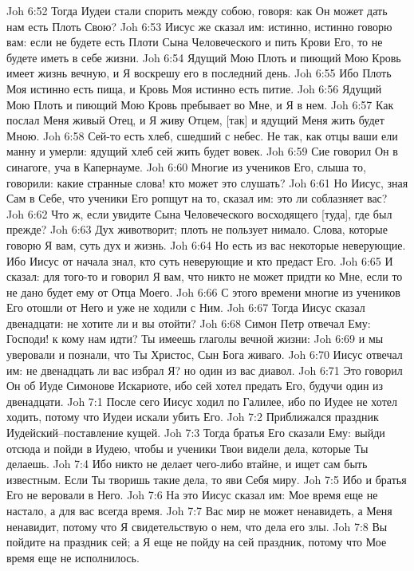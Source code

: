 Joh 6:52  Тогда Иудеи стали спорить между собою, говоря: как Он может дать нам есть Плоть Свою?
Joh 6:53  Иисус же сказал им: истинно, истинно говорю вам: если не будете есть Плоти Сына Человеческого и пить Крови Его, то не будете иметь в себе жизни.
Joh 6:54  Ядущий Мою Плоть и пиющий Мою Кровь имеет жизнь вечную, и Я воскрешу его в последний день.
Joh 6:55  Ибо Плоть Моя истинно есть пища, и Кровь Моя истинно есть питие.
Joh 6:56  Ядущий Мою Плоть и пиющий Мою Кровь пребывает во Мне, и Я в нем.
Joh 6:57  Как послал Меня живый Отец, и Я живу Отцем, [так] и ядущий Меня жить будет Мною.
Joh 6:58  Сей-то есть хлеб, сшедший с небес. Не так, как отцы ваши ели манну и умерли: ядущий хлеб сей жить будет вовек.
Joh 6:59  Сие говорил Он в синагоге, уча в Капернауме.
Joh 6:60  Многие из учеников Его, слыша то, говорили: какие странные слова! кто может это слушать?
Joh 6:61  Но Иисус, зная Сам в Себе, что ученики Его ропщут на то, сказал им: это ли соблазняет вас?
Joh 6:62  Что ж, если увидите Сына Человеческого восходящего [туда], где был прежде?
Joh 6:63  Дух животворит; плоть не пользует нимало. Слова, которые говорю Я вам, суть дух и жизнь.
Joh 6:64  Но есть из вас некоторые неверующие. Ибо Иисус от начала знал, кто суть неверующие и кто предаст Его.
Joh 6:65  И сказал: для того-то и говорил Я вам, что никто не может придти ко Мне, если то не дано будет ему от Отца Моего.
Joh 6:66  С этого времени многие из учеников Его отошли от Него и уже не ходили с Ним.
Joh 6:67  Тогда Иисус сказал двенадцати: не хотите ли и вы отойти?
Joh 6:68  Симон Петр отвечал Ему: Господи! к кому нам идти? Ты имеешь глаголы вечной жизни:
Joh 6:69  и мы уверовали и познали, что Ты Христос, Сын Бога живаго.
Joh 6:70  Иисус отвечал им: не двенадцать ли вас избрал Я? но один из вас диавол.
Joh 6:71  Это говорил Он об Иуде Симонове Искариоте, ибо сей хотел предать Его, будучи один из двенадцати.
Joh 7:1  После сего Иисус ходил по Галилее, ибо по Иудее не хотел ходить, потому что Иудеи искали убить Его.
Joh 7:2  Приближался праздник Иудейский--поставление кущей.
Joh 7:3  Тогда братья Его сказали Ему: выйди отсюда и пойди в Иудею, чтобы и ученики Твои видели дела, которые Ты делаешь.
Joh 7:4  Ибо никто не делает чего-либо втайне, и ищет сам быть известным. Если Ты творишь такие дела, то яви Себя миру.
Joh 7:5  Ибо и братья Его не веровали в Него.
Joh 7:6  На это Иисус сказал им: Мое время еще не настало, а для вас всегда время.
Joh 7:7  Вас мир не может ненавидеть, а Меня ненавидит, потому что Я свидетельствую о нем, что дела его злы.
Joh 7:8  Вы пойдите на праздник сей; а Я еще не пойду на сей праздник, потому что Мое время еще не исполнилось.
